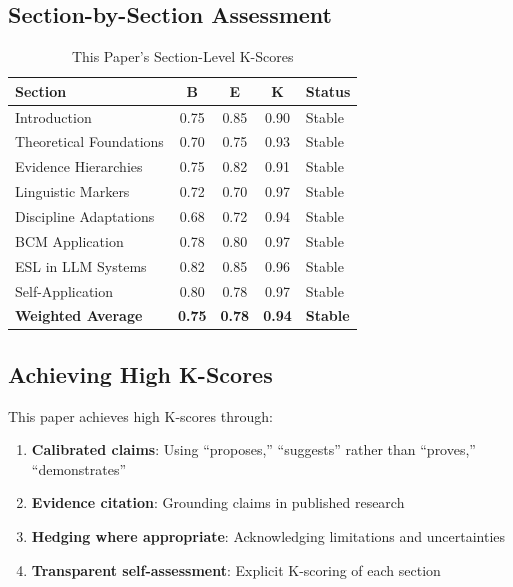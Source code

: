\documentclass[11pt,a4paper]{article}
\begin{document}
\subsection{Section-by-Section Assessment}

\begin{table}[h]
\centering
\caption{This Paper's Section-Level K-Scores}
\label{tab:self-assessment}
\begin{tabular}{lcccl}
\toprule
\textbf{Section} & \textbf{B} & \textbf{E} & \textbf{K} & \textbf{Status} \\
\midrule
Introduction & 0.75 & 0.85 & 0.90 & Stable \\
Theoretical Foundations & 0.70 & 0.75 & 0.93 & Stable \\
Evidence Hierarchies & 0.75 & 0.82 & 0.91 & Stable \\
Linguistic Markers & 0.72 & 0.70 & 0.97 & Stable \\
Discipline Adaptations & 0.68 & 0.72 & 0.94 & Stable \\
BCM Application & 0.78 & 0.80 & 0.97 & Stable \\
ESL in LLM Systems & 0.82 & 0.85 & 0.96 & Stable \\
Self-Application & 0.80 & 0.78 & 0.97 & Stable \\
\midrule
\textbf{Weighted Average} & \textbf{0.75} & \textbf{0.78} & \textbf{0.94} & \textbf{Stable} \\
\bottomrule
\end{tabular}
\end{table}

\subsection{Achieving High K-Scores}

This paper achieves high K-scores through:

\begin{enumerate}
    \item \textbf{Calibrated claims}: Using ``proposes,'' ``suggests''
    rather than ``proves,'' ``demonstrates''
    \item \textbf{Evidence citation}: Grounding claims in published
    research
    \item \textbf{Hedging where appropriate}: Acknowledging limitations
    and uncertainties
    \item \textbf{Transparent self-assessment}: Explicit K-scoring of
    each section
\end{enumerate}
\end{document}
